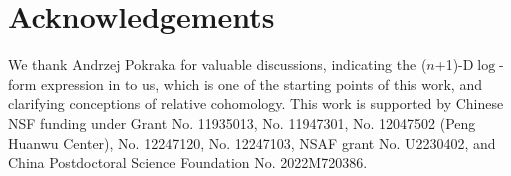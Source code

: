 \documentclass[a4paper,11pt]{article}
\newcommand{\nD}{\mathrm{D}}
\begin{document}
\section*{Acknowledgements}
We thank Andrzej Pokraka for valuable discussions, indicating the ($n$+1)-$\nD \log$-form expression in \cite{De:2023xue} to us, which is one of the starting points of this work, and clarifying conceptions of relative cohomology. This work is supported by Chinese NSF funding under Grant No. 11935013, No. 11947301, No. 12047502 (Peng Huanwu Center), No. 12247120, No. 12247103, NSAF grant No. U2230402, and China Postdoctoral Science Foundation No. 2022M720386.

















\end{document}
